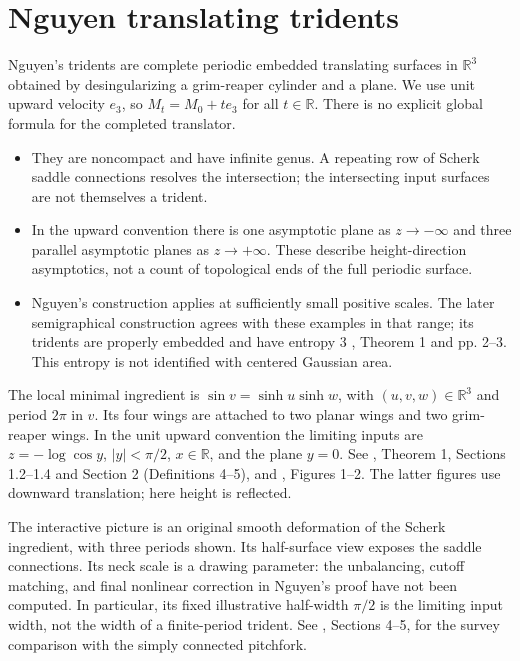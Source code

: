 \chapter{Nguyen translating tridents}\label{sec:catalogue-nguyen-tridents}
\begin{example}\label{ex:catalogue-nguyen-tridents}
Nguyen's tridents are complete periodic embedded translating surfaces in $\mathbb R^3$ obtained by desingularizing a grim-reaper cylinder and a plane. We use unit upward velocity $e_3$, so $M_t=M_0+t e_3$ for all $t\in\mathbb R$. There is no explicit global formula for the completed translator.
\begin{itemize}
\item They are noncompact and have infinite genus. A repeating row of Scherk saddle connections resolves the intersection; the intersecting input surfaces are not themselves a trident.
\item In the upward convention there is one asymptotic plane as $z\to-\infty$ and three parallel asymptotic planes as $z\to+\infty$. These describe height-direction asymptotics, not a count of topological ends of the full periodic surface.
\item Nguyen's construction applies at sufficiently small positive scales. The later semigraphical construction agrees with these examples in that range; its tridents are properly embedded and have entropy $3$ \cite{CatHMWTridents22}, Theorem 1 and pp. 2--3. This entropy is not identified with centered Gaussian area.
\end{itemize}
The local minimal ingredient is $\sin v=\sinh u\sinh w$, with $(u,v,w)\in\mathbb R^3$ and period $2\pi$ in $v$. Its four wings are attached to two planar wings and two grim-reaper wings. In the unit upward convention the limiting inputs are $z=-\log\cos y$, $|y|<\pi/2$, $x\in\mathbb R$, and the plane $y=0$. See \cite{CatNguyen09}, Theorem 1, Sections 1.2--1.4 and Section 2 (Definitions 4--5), and \cite{CatHMWTridents22}, Figures 1--2. The latter figures use downward translation; here height is reflected.

The interactive picture is an original smooth deformation of the Scherk ingredient, with three periods shown. Its half-surface view exposes the saddle connections. Its neck scale is a drawing parameter: the unbalancing, cutoff matching, and final nonlinear correction in Nguyen's proof have not been computed. In particular, its fixed illustrative half-width $\pi/2$ is the limiting input width, not the width of a finite-period trident. See \cite{CatHIMWNotes19}, Sections 4--5, for the survey comparison with the simply connected pitchfork.
\end{example}


